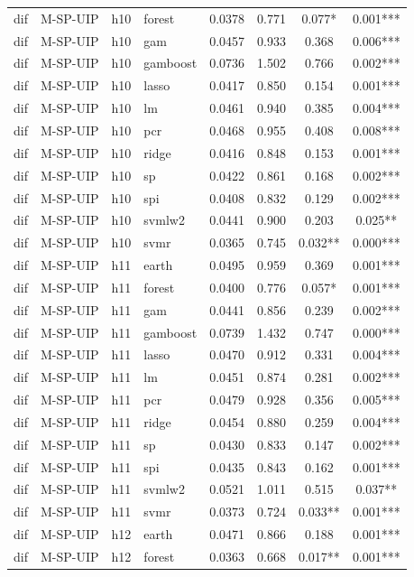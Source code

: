 \begin{ThreePartTable}
\begin{longtable}[t]{llclcccc}
dif & M-SP-UIP & h10 & forest & 0.0378 & 0.771 & 0.077* & 0.001***\\
dif & M-SP-UIP & h10 & gam & 0.0457 & 0.933 & 0.368 & 0.006***\\
dif & M-SP-UIP & h10 & gamboost & 0.0736 & 1.502 & 0.766 & 0.002***\\
dif & M-SP-UIP & h10 & lasso & 0.0417 & 0.850 & 0.154 & 0.001***\\
dif & M-SP-UIP & h10 & lm & 0.0461 & 0.940 & 0.385 & 0.004***\\
dif & M-SP-UIP & h10 & pcr & 0.0468 & 0.955 & 0.408 & 0.008***\\
dif & M-SP-UIP & h10 & ridge & 0.0416 & 0.848 & 0.153 & 0.001***\\
dif & M-SP-UIP & h10 & sp & 0.0422 & 0.861 & 0.168 & 0.002***\\
dif & M-SP-UIP & h10 & spi & 0.0408 & 0.832 & 0.129 & 0.002***\\
dif & M-SP-UIP & h10 & svmlw2 & 0.0441 & 0.900 & 0.203 & 0.025**\\
dif & M-SP-UIP & h10 & svmr & 0.0365 & 0.745 & 0.032** & 0.000***\\
\addlinespace
dif & M-SP-UIP & h11 & earth & 0.0495 & 0.959 & 0.369 & 0.001***\\
dif & M-SP-UIP & h11 & forest & 0.0400 & 0.776 & 0.057* & 0.001***\\
dif & M-SP-UIP & h11 & gam & 0.0441 & 0.856 & 0.239 & 0.002***\\
dif & M-SP-UIP & h11 & gamboost & 0.0739 & 1.432 & 0.747 & 0.000***\\
dif & M-SP-UIP & h11 & lasso & 0.0470 & 0.912 & 0.331 & 0.004***\\
dif & M-SP-UIP & h11 & lm & 0.0451 & 0.874 & 0.281 & 0.002***\\
dif & M-SP-UIP & h11 & pcr & 0.0479 & 0.928 & 0.356 & 0.005***\\
dif & M-SP-UIP & h11 & ridge & 0.0454 & 0.880 & 0.259 & 0.004***\\
dif & M-SP-UIP & h11 & sp & 0.0430 & 0.833 & 0.147 & 0.002***\\
dif & M-SP-UIP & h11 & spi & 0.0435 & 0.843 & 0.162 & 0.001***\\
dif & M-SP-UIP & h11 & svmlw2 & 0.0521 & 1.011 & 0.515 & 0.037**\\
dif & M-SP-UIP & h11 & svmr & 0.0373 & 0.724 & 0.033** & 0.001***\\
\addlinespace
dif & M-SP-UIP & h12 & earth & 0.0471 & 0.866 & 0.188 & 0.001***\\
dif & M-SP-UIP & h12 & forest & 0.0363 & 0.668 & 0.017** & 0.001***\\

\end{longtable}
\end{ThreePartTable}
